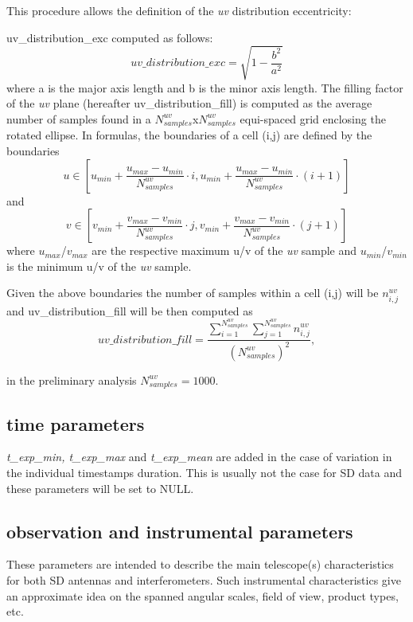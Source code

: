 \documentclass[11pt,a4paper]{ivoa}
\begin{document}
This procedure allows the definition of the \emph{uv} distribution eccentricity:

uv\_distribution\_exc computed as follows:
\begin{equation}
uv\_distribution\_exc = \sqrt{1-\frac{b^2}{a^2}}
\end{equation}
where a is the major axis length and b is the minor axis length.
The filling factor of the \emph{uv} plane (hereafter uv\_distribution\_fill) is computed as the average 
number of samples found in a $N^{uv}_{samples}$x$N^{uv}_{samples}$ equi-spaced grid enclosing the 
rotated ellipse. In formulas, the boundaries of a cell (i,j) are defined by the boundaries
\begin{equation}
u \in [u_{min} + \frac{u_{max} - u_{min}}{N^{uv}_{samples}} \cdot i , u_{min} + \frac{u_{max} - 
u_{min}}{N^{uv}_{samples}} \cdot (i + 1)]
\end{equation} 
and
\begin{equation}
v \in [v_{min} + \frac{v_{max} - v_{min}}{N^{uv}_{samples}} \cdot j , v_{min} + \frac{v_{max} - 
v_{min}}{N^{uv}_{samples}} \cdot (j + 1)]
\end{equation} 
where $u_{max}$/$v_{max}$ are the respective maximum u/v of the \emph{uv} sample and 
$u_{min}$/$v_{min}$ is the minimum u/v of the \emph{uv} sample.

Given the above boundaries the number of samples within a cell (i,j) will be $n^{uv}_{i,j}$ 
and uv\_distribution\_fill will be then computed as 
\begin{equation}
uv\_distribution\_fill = \frac{\sum^{N^{uv}_{samples}}_{i=1} \sum^{N^{uv}_{samples}}_{j=1} 
n^{uv}_{i,j} }{(N^{uv}_{samples}) ^ 2},
\end{equation}

in the preliminary analysis $N^{uv}_{samples} = 1000$.



\subsection{time parameters}
\emph{t\_exp\_min, t\_exp\_max }and \emph{t\_exp\_mean} are added in the case of variation in the individual timestamps 
duration. This is usually not the case for SD data and these parameters will be set to NULL.


\subsection{observation and instrumental parameters}
These parameters are intended to describe the main telescope(s) characteristics for both SD antennas and interferometers. 
Such instrumental characteristics give an approximate idea on the spanned angular scales, field of view, product types, etc.
\end{document}
